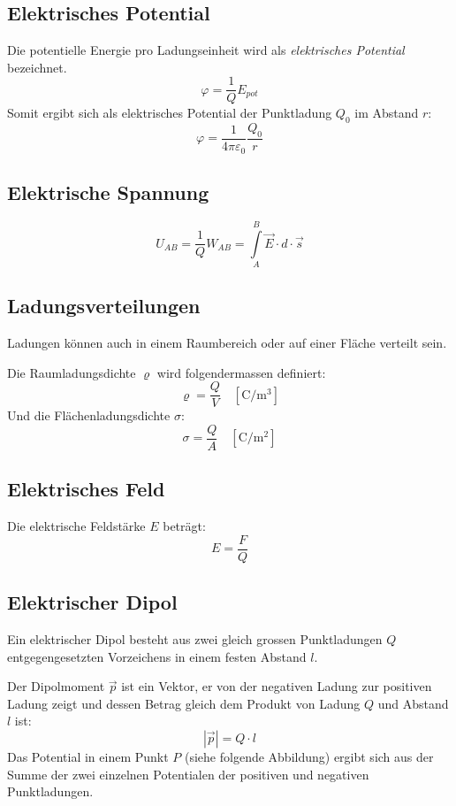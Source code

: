 \subsection{Elektrisches Potential}

Die potentielle Energie pro Ladungseinheit wird als \textit{elektrisches
Potential} bezeichnet.
\[
	\varphi = \frac{1}{Q} E_{pot}
\]
Somit ergibt sich als elektrisches Potential der Punktladung $Q_0$ im Abstand $r$:
\[
	\varphi = \frac{1}{4\pi\varepsilon_0} \frac{Q_0}{r}
\]

\subsection{Elektrische Spannung}
\[
	U_{AB} = \frac{1}{Q} W_{AB} = \int\limits^B_A \vec{E} \cdot d \cdot \vec{s}
\]

\subsection{Ladungsverteilungen}

Ladungen können auch in einem Raumbereich oder auf einer Fläche verteilt sein.

Die Raumladungsdichte $\varrho$ wird folgendermassen definiert:
\[
	\varrho = \frac{Q}{V}
	\quad \left[ \textrm{C}/\textrm{m}^3 \right]
\]
Und die Flächenladungsdichte $\sigma$:
\[
	\sigma = \frac{Q}{A}
	\quad \left[ \textrm{C}/\textrm{m}^2 \right]
\]

\subsection{Elektrisches Feld}

Die elektrische Feldstärke $E$ beträgt:
\[
	E = \frac{F}{Q}
\]

\subsection{Elektrischer Dipol}

Ein elektrischer Dipol besteht aus zwei gleich grossen Punktladungen $Q$
entgegengesetzten Vorzeichens in einem festen Abstand $l$.

Der Dipolmoment $\vec{p}$ ist ein Vektor, er von der negativen Ladung zur
positiven Ladung zeigt und dessen Betrag gleich dem Produkt von Ladung $Q$ und
Abstand $l$ ist:
\[
	|\vec{p}| = Q \cdot l
\]
Das Potential in einem Punkt $P$ (siehe folgende Abbildung) ergibt sich aus der
Summe der zwei einzelnen Potentialen der positiven und negativen Punktladungen.

